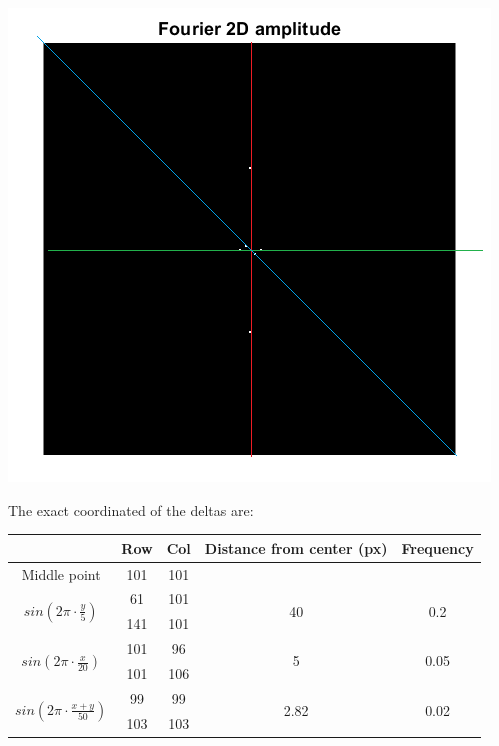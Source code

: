 \documentclass[a4paper]{iacas}
\begin{document}
\vskip 0.1in
\begin{minipage}{0.5\textwidth}
\centering
	\includegraphics[scale=1]{../imgs/q1_2_colored.png}
\end{minipage}
\vskip 0.1in

The exact coordinated of the deltas are:

\begin{table}[]
\begin{tabular}{|c|c|c|c|c|}
\hline
                            & Row & Col & Distance from center (px) & Frequency             \\ \hline
Middle point                & 101 & 101 &                           &                       \\ \hline
\multirow{2}{*}{$sin(2\pi \cdot \frac{y}{5})$} & 61  & 101 & \multirow{2}{*}{40}       & \multirow{2}{*}{0.2}  \\ \cline{2-3}
                            & 141 & 101 &                           &                       \\ \hline
\multirow{2}{*}{$sin(2\pi \cdot \frac{x}{20})$}  & 101 & 96  & \multirow{2}{*}{5}        & \multirow{2}{*}{0.05} \\ \cline{2-3}
                            & 101 & 106 &                           &                       \\ \hline
\multirow{2}{*}{$sin(2\pi \cdot \frac{x+y}{50})$}  & 99  & 99  & \multirow{2}{*}{2.82}     & \multirow{2}{*}{0.02} \\ \cline{2-3}
                            & 103 & 103 &                           &                       \\ \hline
\end{tabular}
\end{table}
\end{document}
